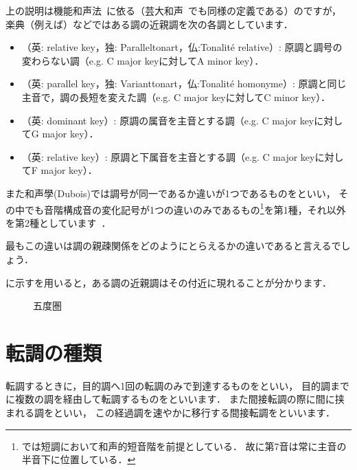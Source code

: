 \documentclass[dvipdfmx,uplatex,b5paper,openany,jbase=12Q,nomag*,textwidth-limit=44%
               ]{gachimuchi}[2020/05/05]
\begin{document}
\begin{Yodan}
上の説明は機能和声法~\cite{chMOROI1a}に依る（芸大和声~\cite[p.97]{chSHIMAOKA1ii}でも同様の定義である）のですが，
楽典（例えば\cite{mgKIKUCHI1}）などではある調の近親調を次の各調としています．
\begin{itemize}
  \item {}（英: relative key，独: Paralleltonart，仏:Tonalité relative）:
        原調と調号の変わらない調（e.g. C major keyに対してA minor key）．
  \item {}（英: parallel key，独: Varianttonart，仏:Tonalité homonyme）:
        原調と同じ主音で，調の長短を変えた調（e.g. C major keyに対してC minor key）．
  \item {}（英: dominant key）:
        原調の属音を主音とする調（e.g. C major keyに対してG major key）．
  \item {}（英: relative key）:
        原調と下属音を主音とする調（e.g. C major keyに対してF major key）．
\end{itemize}

また和声學(Dubois)では調号が同一であるか違いが1つであるものをといい，
その中でも音階構成音の変化記号が1つの違いのみであるもの\footnote{%
  では短調において和声的短音階を前提としている．
  故に第7音は常に主音の半音下に位置している．
}を第1種，それ以外を第2種としています~\cite[p.49]{chDUBOIS1}．

最もこの違いは調の親疎関係をどのようにとらえるかの違いであると言えるでしょう．
\end{Yodan}

に示すを用いると，ある調の近親調はその付近に現れることが分かります．
\begin{figure}[ht]
\begin{center}
  
  \caption{五度圏}
\end{center}
\end{figure}

\section{転調の種類}
転調するときに，目的調へ1回の転調のみで到達するものをといい，
目的調までに複数の調を経由して転調するものをといいます．
また間接転調の際に間に挟まれる調をといい，
この経過調を速やかに移行する間接転調をといいます．
\end{document}
